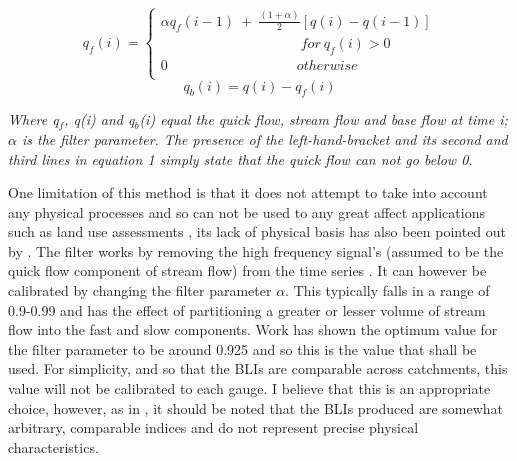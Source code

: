\documentclass[DIV=calc, paper=a4, fontsize=11pt, twocolumn]{scrartcl}	 %
\begin{document}
\begin{equation}
q_{f}(i) =
\begin{cases}
\alpha q_{f} (i-1) \  + \ \frac{(1+\alpha)}{2}[q(i)-q(i-1)] \\ \quad\quad\quad\quad\quad\quad\quad\quad\quad\quad \textit{for}\  q_f(i) >0\\
0 \quad\quad\quad\quad\quad\quad\quad\quad\quad \ otherwise\\
\end{cases}
\end{equation}
\begin{equation}
q_b(i) = q(i) - q_f(i)
\end{equation}

\begin{center}
\textit{Where q$_f$, q(i) and q$_b$(i) equal the quick flow, stream flow and base flow at time i; $\alpha$ is the filter parameter. The presence of the left-hand-bracket and its second and third lines in equation 1 simply state that the quick flow can not go below 0.}
\end{center}

One limitation of this method is that it does not attempt to take into account any physical processes and so can not be used to any great affect applications such as land use assessments \citep{Ladson2013}, its lack of physical basis has also been pointed out by \citet{Chapman1991}. The filter works by removing the high frequency signal's (assumed to be the quick flow component of stream flow) from the time series \citep{Nathan1990}. It can however be calibrated by changing the filter parameter $\alpha$. This typically falls in a range of 0.9-0.99 and has the effect of partitioning a greater or lesser volume of stream flow into the fast and slow components. Work has shown the optimum value for the filter parameter to be around 0.925 \citep{Nathan1990} and so this is the value that shall be used. For simplicity, and so that the BLIs are comparable across catchments, this value will not be calibrated to each gauge. I believe that this is an appropriate choice, however, as in \citet{Nathan1990, Nathan1991}, it should be noted that the BLIs produced are somewhat arbitrary, comparable indices and do not represent precise physical characteristics.
\end{document}
